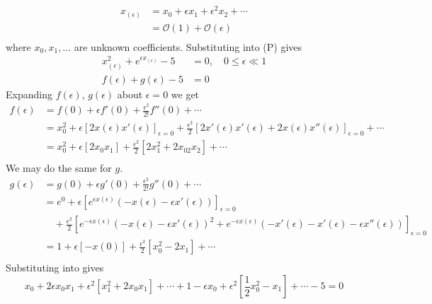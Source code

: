 \documentclass[12pt,twoside]{article}
\begin{document}
\begin{equation*}
  \begin{aligned}
    x_{(\epsilon)}&=x_0+\epsilon x_1 + \epsilon^2x_2+\cdots \\
    &= \mathcal{O}(1) + \mathcal{O}(\epsilon) \\
  \end{aligned}
\end{equation*}
where $x_0, x_1,\ldots$ are unknown coefficients. Substituting into (P) gives
\begin{equation*}
  \begin{aligned}
    x^2_{(\epsilon)}+e^{\epsilon x_{(\epsilon)}} - 5 &= 0,\quad 0\le\epsilon\ll1 \\
    f(\epsilon) + g(\epsilon) -5 &= 0
  \end{aligned}
\end{equation*}
Expanding $f(\epsilon)$, $g(\epsilon)$ about $\epsilon=0$ we get
\begin{equation*}
  \begin{aligned}
    f(\epsilon) &= f(0) + \epsilon f'(0) + \frac{\epsilon^2}{2!}f''(0)+\cdots \\
    &= x^2_{0} + \epsilon[2x(\epsilon)x'(\epsilon)]_{\epsilon=0} +
    \frac{\epsilon^2}{2}[2x'(\epsilon)x'(\epsilon)+2x(\epsilon)x''(\epsilon)]_{\epsilon=0}
    + \cdots \\
    &= x_0^2+\epsilon[2x_0x_1] + \frac{\epsilon^2}{2}[2x_1^2 + 2x_02x_2] + \cdots \\
  \end{aligned}
\end{equation*}
We may do the same for $g$.
\begin{equation*}
  \begin{aligned}
    g(\epsilon) &= g(0) + \epsilon g'(0) + \frac{\epsilon^2}{2!}g''(0) + \cdots \\
    &= e^0+\epsilon[e^{\epsilon x(\epsilon)}(-x(\epsilon)-\epsilon x'(\epsilon))]_{\epsilon=0} \\
    &\quad+ \frac{\epsilon^2}{2}[e^{-\epsilon x(\epsilon)}(-x(\epsilon)-\epsilon x'(\epsilon))^2
    + e^{-\epsilon x(\epsilon)}(-x'(\epsilon)-x'(\epsilon)-\epsilon x''(\epsilon))]_{\epsilon=0} \\
    &= 1 + \epsilon[-x(0)]+\frac{\epsilon^2}{2}[x_0^2-2x_1] + \cdots \\
  \end{aligned}
\end{equation*}
Substituting into  gives
\begin{equation*}
  x_0 + 2\epsilon x_0x_1+\epsilon^2[x_1^2+2x_0x_1]+\cdots + 1 - \epsilon x_0 +
  \epsilon^2[\frac{1}{2}x_0^2-x_1] + \cdots - 5 = 0
\end{equation*}
\end{document}
